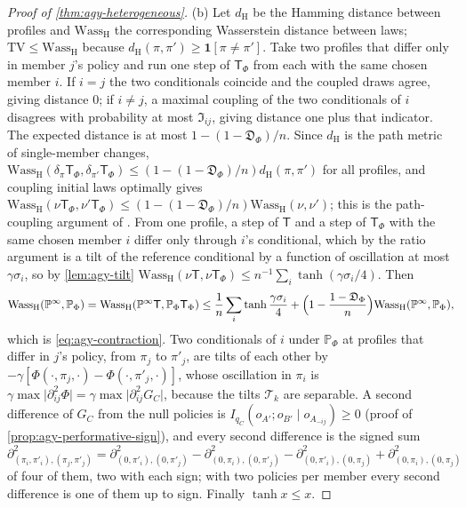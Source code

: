 \begin{proof}[Proof of \cref{thm:agy-heterogeneous}]
(b) Let $d_{\mathrm H}$ be the Hamming distance between profiles and $\mathrm{Wass}_{\mathrm H}$ the corresponding Wasserstein distance between laws; $\mathrm{TV}\le \mathrm{Wass}_{\mathrm H}$ because $d_{\mathrm H}(\pi,\pi')\ge\mathbf 1[\pi\ne\pi']$. Take two profiles that differ only in member $j$'s policy and run one step of $\mathsf T_\Phi$ from each with the same chosen member $i$. If $i=j$ the two conditionals coincide and the coupled draws agree, giving distance $0$; if $i\ne j$, a maximal coupling of the two conditionals of $i$ disagrees with probability at most $\mathfrak I_{ij}$, giving distance one plus that indicator. The expected distance is at most $1-(1-\mathfrak D_\Phi)/n$. Since $d_{\mathrm H}$ is the path metric of single-member changes, $\mathrm{Wass}_{\mathrm H}(\delta_\pi\mathsf T_\Phi,\delta_{\pi'}\mathsf T_\Phi)\le(1-(1-\mathfrak D_\Phi)/n)d_{\mathrm H}(\pi,\pi')$ for all profiles, and coupling initial laws optimally gives $\mathrm{Wass}_{\mathrm H}(\nu\mathsf T_\Phi,\nu'\mathsf T_\Phi)\le(1-(1-\mathfrak D_\Phi)/n)\mathrm{Wass}_{\mathrm H}(\nu,\nu')$; this is the path-coupling argument of \citet{bubley1997path}. From one profile, a step of $\mathsf T$ and a step of $\mathsf T_\Phi$ with the same chosen member $i$ differ only through $i$'s conditional, which by the ratio argument is a tilt of the reference conditional by a function of oscillation at most $\gamma\sigma_i$, so by \cref{lem:agy-tilt} $\mathrm{Wass}_{\mathrm H}(\nu\mathsf T,\nu\mathsf T_\Phi)\le n^{-1}\sum_i\tanh(\gamma\sigma_i/4)$. Then
\begin{equation*}
\mathrm{Wass}_{\mathrm H}(\mathbb P^\infty,\mathbb P_\Phi)=\mathrm{Wass}_{\mathrm H}(\mathbb P^\infty\mathsf T,\mathbb P_\Phi\mathsf T_\Phi)\le\frac1n\sum_i\tanh\frac{\gamma\sigma_i}4+\Bigl(1-\frac{1-\mathfrak D_\Phi}n\Bigr)\mathrm{Wass}_{\mathrm H}(\mathbb P^\infty,\mathbb P_\Phi),
\end{equation*}
which is \eqref{eq:agy-contraction}. Two conditionals of $i$ under $\mathbb P_\Phi$ at profiles that differ in $j$'s policy, from $\pi_j$ to $\pi'_j$, are tilts of each other by $-\gamma[\Phi(\cdot,\pi_j,\cdot)-\Phi(\cdot,\pi'_j,\cdot)]$, whose oscillation in $\pi_i$ is $\gamma\max\lvert\partial^2_{ij}\Phi\rvert=\gamma\max\lvert\partial^2_{ij}G_C\rvert$, because the tilts $\mathcal T_k$ are separable. A second difference of $G_C$ from the null policies is $I_{q_C}(o_{A'};o_{B'}\mid o_{A_{-ij}})\ge0$ (proof of \cref{prop:agy-performative-sign}), and every second difference is the signed sum $\partial^2_{(\pi_i,\pi'_i),(\pi_j,\pi'_j)}=\partial^2_{(0,\pi'_i),(0,\pi'_j)}-\partial^2_{(0,\pi_i),(0,\pi'_j)}-\partial^2_{(0,\pi'_i),(0,\pi_j)}+\partial^2_{(0,\pi_i),(0,\pi_j)}$ of four of them, two with each sign; with two policies per member every second difference is one of them up to sign. Finally $\tanh x\le x$.


\end{proof}
